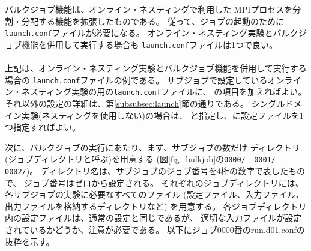 バルクジョブ機能は、オンライン・ネスティングで利用した
MPIプロセスを分割・分配する機能を拡張したものである。
従って、ジョブの起動のために\verb|launch.conf|ファイルが必要になる。
オンライン・ネスティング実験とバルクジョブ機能を併用して実行する場合も
\verb|launch.conf|ファイルは1つで良い。\\

\\

\noindent 上記は、オンライン・ネスティング実験とバルクジョブ機能を併用して実行する場合の
\verb|launch.conf|ファイルの例である。
サブジョブで設定しているオンライン・ネスティング実験の用の\verb|launch.conf|ファイルに、
の項目を加えればよい。
それ以外の設定の詳細は、第\ref{subsubsec:launch}節の通りである。
シングルドメイン実験(ネスティングを使用しない)の場合は、
と指定し、に設定ファイルを1つ指定すればよい。


次に、バルクジョブの実行にあたり、まず、サブジョブの数だけ
ディレクトリ(ジョブディレクトリと呼ぶ)を用意する
(図\ref{fig_bulkjob}の\verb|0000/  0001/  0002/|)。
ディレクトリ名は、サブジョブのジョブ番号を4桁の数字で表したもので、
ジョブ番号はゼロから設定される。
それぞれのジョブディレクトリには、各サブジョブの実験に必要なすべてのファイル
(設定ファイル、入力ファイル、出力ファイルを格納するディレクトリなど) を用意する。
%
各ジョブディレクトリ内の設定ファイルは、通常の設定と同じであるが、
適切な入力ファイルが設定されているかどうか、注意が必要である。
以下にジョブ0000番のrun.d01.confの抜粋を示す。\\



